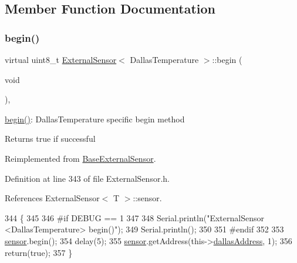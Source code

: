 \subsection{Member Function Documentation}
\mbox{\label{classExternalSensor_3_01DallasTemperature_01_4_ac5275129b05e2ff8df45d5b222a661d9}} 
\subsubsection{\texorpdfstring{begin()}{begin()}}
{\footnotesize\ttfamily virtual uint8\+\_\+t \hyperlink{classExternalSensor}{External\+Sensor}$<$ Dallas\+Temperature $>$\+::begin (\begin{DoxyParamCaption}\item[{void}]{ }\end{DoxyParamCaption})\hspace{0.3cm}{\ttfamily [inline]}, {\ttfamily [virtual]}}

\hyperlink{classExternalSensor_3_01DallasTemperature_01_4_ac5275129b05e2ff8df45d5b222a661d9}{begin()}\+: Dallas\+Temperature specific begin method

\begin{DoxyReturn}{Returns}
true if successful 
\end{DoxyReturn}


Reimplemented from \hyperlink{classBaseExternalSensor_a87d132803d4f4fdd4e66332809f0c9a0}{Base\+External\+Sensor}.



Definition at line 343 of file External\+Sensor.\+h.



References External\+Sensor$<$ T $>$\+::sensor.


\begin{DoxyCode}
344     \{
345     
346 \textcolor{preprocessor}{    #if DEBUG == 1 }
347 
348         Serial.println(\textcolor{stringliteral}{"ExternalSensor <DallasTemperature> begin()"});
349         Serial.println();
350     
351 \textcolor{preprocessor}{    #endif}
352     
353         \hyperlink{classExternalSensor_3_01DallasTemperature_01_4_adb6ba4fcdedef95ad8f6b0c9b6c0f9d1}{sensor}.begin(); 
354         delay(5);
355         \hyperlink{classExternalSensor_3_01DallasTemperature_01_4_adb6ba4fcdedef95ad8f6b0c9b6c0f9d1}{sensor}.getAddress(this->\hyperlink{classExternalSensor_3_01DallasTemperature_01_4_a7d9e9d2893e453638fcf440e5d8d9082}{dallasAddress}, 1);   
356         \textcolor{keywordflow}{return}(\textcolor{keyword}{true});
357     \}
\end{DoxyCode}
\mbox{\label{classExternalSensor_3_01DallasTemperature_01_4_a1e725d9338314515d4e5dc456ed6a6c8}} 
